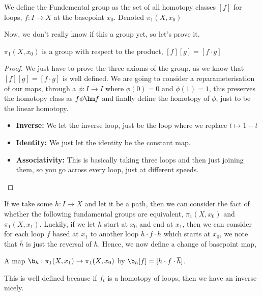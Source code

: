 \begin{ndefi}
  We define the Fundemental group as the set of all homotopy classes $[f]$ for loops, $f: I \to X$ at the basepoint $x_0$. Denoted $\pi_1(X, x_0)$
\end{ndefi}

Now, we don't really know if this a group yet, so let's prove it.
\begin{nprop}
  $\pi_1(X, x_0)$ is a group with respect to the product, $[f][g] = [f \cdot g]$
\end{nprop}
\begin{proof}
  We just have to prove the three axioms of the group, as we know that $[f][g] = [f \cdot g]$ is well defined. We are going to consider a reparameterisation of our maps, through a $\phi : I \to I$ where $\phi(0) = 0$ and $\phi(1)=1$, this preserves the homotopy class as $f\phi \hm f$ and finally define the homotopy of $\phi$, just to be the linear homotopy.
  \begin{itemize}
    \item \textbf{Inverse: }We let the inverse loop, just be the loop where we replace $t \mapsto 1 - t$
    \item \textbf{Identity: }We just let the identity be the constant map.
    \item \textbf{Associativity: }This is basically taking three loops and then just joining them, so you go across every loop, just at different speeds.
  \end{itemize}
\end{proof}

If we take some $h : I \to X$ and let it be a path, then we can consider the fact of whether the following fundamental groups are equivalent, $\pi_1(X, x_0)$ and $\pi_1(X, x_1)$. Luckily, if we let $h$ start at $x_0$ and end at $x_1$, then we can consider for each loop $f$ based at $x_1$ to another loop $h \cdot f \cdot \overline{h}$ which starts at $x_0$, we note that $\overline{h}$ is just the reversal of $h$. Hence, we now define a change of basepoint map,
\begin{ndefi}
  A map $\b_h: \pi_1(X, x_1) \to \pi_1(X, x_0)$ by $\b_h[f] = [h \cdot f \cdot \overline{h}]$.
\end{ndefi}
This is well defined because if $f_t$ is a homotopy of loops, then we have an inverse nicely.

